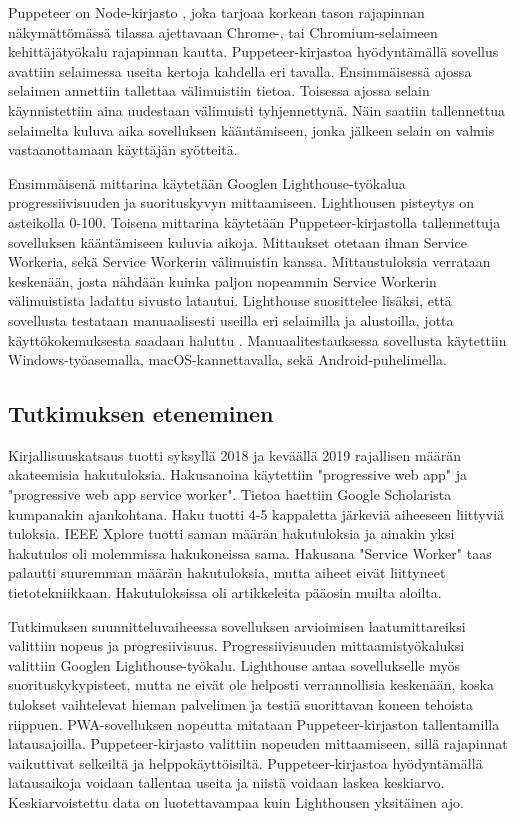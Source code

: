 \documentclass{tktltiki}
\begin{document}
\clearpage

Puppeteer on Node-kirjasto \cite{Google3}, joka tarjoaa korkean tason rajapinnan näkymättömässä tilassa ajettavaan Chrome-, tai Chromium-selaimeen kehittäjätyökalu rajapinnan kautta. Puppeteer-kirjastoa hyödyntämällä sovellus avattiin selaimessa useita kertoja kahdella eri tavalla. Ensimmäisessä ajossa selaimen annettiin tallettaa välimuistiin tietoa. Toisessa ajossa selain käynnistettiin aina uudestaan välimuisti tyhjennettynä. Näin saatiin tallennettua selaimelta kuluva aika sovelluksen kääntämiseen, jonka jälkeen selain on valmis vastaanottamaan käyttäjän syötteitä. 

Ensimmäisenä mittarina käytetään Googlen Lighthouse-työkalua progressiivisuuden ja suorituskyvyn mittaamiseen. Lighthousen pisteytys on asteikolla 0-100. Toisena mittarina käytetään Puppeteer-kirjastolla tallennettuja sovelluksen kääntämiseen kuluvia aikoja. Mittaukset otetaan ilman Service Workeria, sekä Service Workerin välimuistin kanssa. Mittaustuloksia verrataan keskenään, josta nähdään kuinka paljon nopeammin Service Workerin välimuistista ladattu sivusto latautui. Lighthouse suosittelee lisäksi, että sovellusta testataan manuaalisesti useilla eri selaimilla ja alustoilla, jotta käyttökokemuksesta saadaan haluttu \cite{von2018progressive}. Manuaalitestauksessa sovellusta käytettiin Windows-työasemalla, macOS-kannettavalla, sekä Android-puhelimella.

\subsection{Tutkimuksen eteneminen}

Kirjallisuuskatsaus tuotti syksyllä 2018 ja keväällä 2019 rajallisen määrän akateemisia hakutuloksia. Hakusanoina käytettiin "progressive web app" ja "progressive web app service worker". Tietoa haettiin Google Scholarista kumpanakin ajankohtana. Haku tuotti 4-5 kappaletta järkeviä aiheeseen liittyviä tuloksia. IEEE Xplore tuotti saman määrän hakutuloksia ja ainakin yksi hakutulos oli molemmissa hakukoneissa sama. Hakusana "Service Worker" taas palautti suuremman määrän hakutuloksia, mutta aiheet eivät liittyneet tietotekniikkaan. Hakutuloksissa oli artikkeleita pääosin muilta aloilta. 

Tutkimuksen suunnitteluvaiheessa sovelluksen arvioimisen laatumittareiksi valittiin nopeus ja progresiivisuus. Progressiivisuuden mittaamistyökaluksi valittiin Googlen Lighthouse-työkalu. Lighthouse antaa sovellukselle myös suorituskykypisteet, mutta ne eivät ole helposti verrannollisia keskenään, koska tulokset vaihtelevat hieman palvelimen ja testiä suorittavan koneen tehoista riippuen. 
PWA-sovelluksen nopeutta mitataan Puppeteer-kirjaston tallentamilla latausajoilla. Puppeteer-kirjasto valittiin nopeuden mittaamiseen, sillä rajapinnat vaikuttivat selkeiltä ja helppokäyttöisiltä. Puppeteer-kirjastoa hyödyntämällä latausaikoja voidaan tallentaa useita ja niistä voidaan laskea keskiarvo. Keskiarvoistettu data on luotettavampaa kuin Lighthousen yksitäinen ajo.
\end{document}
